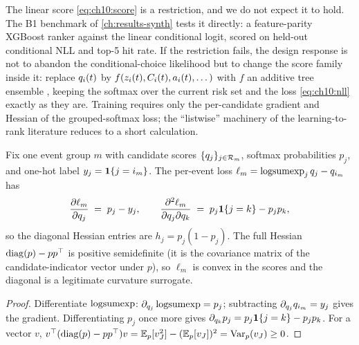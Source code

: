 The linear score \cref{eq:ch10:score} is a restriction, and we do not
expect it to hold. The B1 benchmark of \cref{ch:results-synth} tests it
directly: a feature-parity XGBoost ranker against the linear
conditional logit, scored on held-out conditional NLL and top-5 hit
rate. If the restriction fails, the design response is not to abandon
the conditional-choice likelihood but to change the score family inside
it: replace $q_i(t)$ by $f(z_i(t), C_i(t), a_i(t),
\dots)$ with $f$ an additive tree ensemble
\citep{friedman2001,chenguestrin2016}, keeping the softmax over the
current risk set and the loss \cref{eq:ch10:nll} exactly as they are.
Training requires only the per-candidate gradient and Hessian of the
grouped-softmax loss; the ``listwise'' machinery of the learning-to-rank
literature reduces to a short calculation.

\begin{lemma}\label{lem:ch10:gradhess}
Fix one event group $m$ with candidate scores $\{q_j\}_{j \in
\mathcal{R}_m}$, softmax probabilities $p_j$, and one-hot label $y_j =
\mathbf{1}\{j = i_m\}$. The per-event loss $\ell_m = \operatorname{logsumexp}_j q_j -
q_{i_m}$ has
\begin{equation}\label{eq:ch10:gradhess}
\frac{\partial \ell_m}{\partial q_j} \;=\; p_j - y_j,
\qquad
\frac{\partial^2 \ell_m}{\partial q_j \partial q_k}
 \;=\; p_j \mathbf{1}\{j = k\} - p_j p_k,
\end{equation}
so the diagonal Hessian entries are $h_j = p_j(1 - p_j)$. The full
Hessian $\operatorname{diag}(p) - p p^{\top}$ is positive semidefinite (it is the
covariance matrix of the candidate-indicator vector under $p$), so
$\ell_m$ is convex in the scores and the diagonal is a legitimate
curvature surrogate.
\end{lemma}

\begin{proof}
Differentiate $\operatorname{logsumexp}$: $\partial_{q_j} \operatorname{logsumexp} = p_j$;
subtracting $\partial_{q_j} q_{i_m} = y_j$ gives the gradient.
Differentiating $p_j$ once more gives $\partial_{q_k} p_j = p_j
\mathbf{1}\{j=k\} - p_j p_k$. For a vector $v$, $v^{\top}(\operatorname{diag}(p) - pp^{\top})v = \mathbb{E}_p[v_J^2]
- (\mathbb{E}_p[v_J])^2 = \operatorname{Var}_p(v_J) \ge 0$.
\end{proof}

